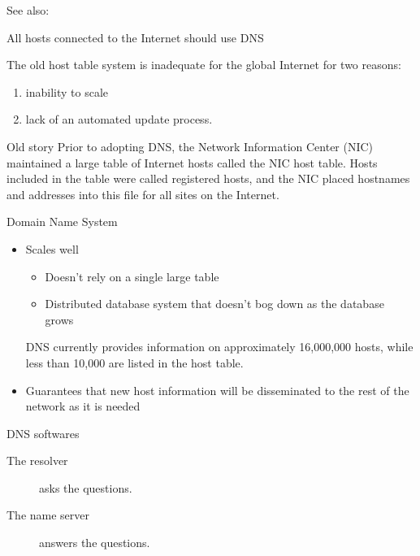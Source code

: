 See also: 

\begin{frame}{All hosts connected to the Internet should use DNS}
  \begin{iblock}{The old host table system is inadequate for the global Internet for two
      reasons:}
    \begin{enumerate}
    \item inability to scale
    \item lack of an automated update process.
    \end{enumerate}
  \end{iblock}
  \begin{iblock}{Old story}
    Prior to adopting DNS, the Network Information Center (NIC) maintained a large table
    of Internet hosts called the NIC host table. Hosts included in the table were called
    registered hosts, and the NIC placed hostnames and addresses into this file for all
    sites on the Internet.
  \end{iblock}
\end{frame}

\begin{frame}{Domain Name System}
  \begin{itemize}
  \item Scales well
    \begin{itemize}
    \item Doesn't rely on a single large table
    \item Distributed database system that doesn't bog down as the database grows
    \end{itemize}
    DNS currently provides information on approximately 16,000,000 hosts, while less than
    10,000 are listed in the host table.
  \item Guarantees that new host information will be disseminated to the rest of the
    network as it is needed
  \end{itemize}
\end{frame}

\begin{frame}{DNS softwares}
  \begin{center}
     
  \end{center}
  \begin{description}
  \item[The resolver]  asks the questions.
  \item[The name server]  answers the questions.
  \end{description}
\end{frame}

